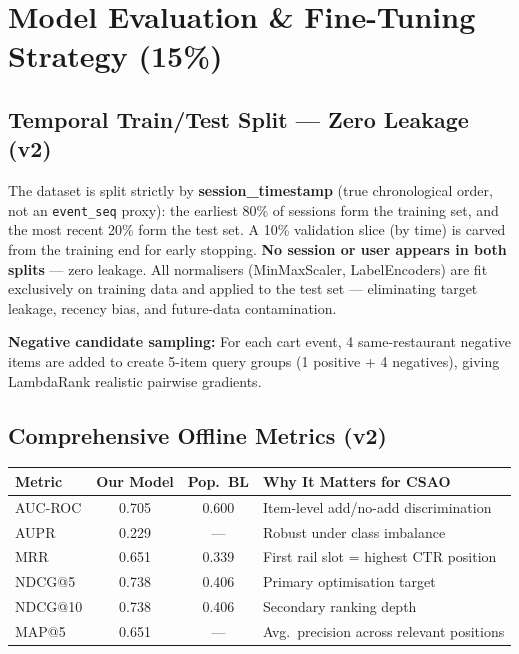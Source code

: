 \documentclass[11pt,a4paper]{article}
\begin{document}
\section{Model Evaluation \& Fine-Tuning Strategy (15\%)}

\subsection{Temporal Train/Test Split --- Zero Leakage (v2)}

The dataset is split strictly by \textbf{session\_timestamp}
(true chronological order, not an \texttt{event\_seq} proxy):
the earliest 80\% of sessions form the training set,
and the most recent 20\% form the test set.
A 10\% validation slice (by time) is carved from the training end
for early stopping.
\textbf{No session or user appears in both splits} --- zero leakage.
All normalisers (MinMaxScaler, LabelEncoders) are fit exclusively on
training data and applied to the test set --- eliminating target leakage,
recency bias, and future-data contamination.

\textbf{Negative candidate sampling:} For each cart event, 4 same-restaurant
negative items are added to create 5-item query groups
(1 positive + 4 negatives), giving LambdaRank realistic pairwise gradients.

\subsection{Comprehensive Offline Metrics (v2)}

{\small
\begin{center}
\begin{tabularx}{\linewidth}{l c c >{\RaggedRight\arraybackslash}X}
  \toprule
  \textbf{Metric} & \textbf{Our Model} & \textbf{Pop.\ BL} &
    \textbf{Why It Matters for CSAO} \\
  \midrule
  AUC-ROC      & 0.705 & 0.600 & Item-level add/no-add discrimination \\
  AUPR         & 0.229 & ---   & Robust under class imbalance \\
  MRR          & 0.651 & 0.339 & First rail slot = highest CTR position \\
  NDCG@5       & 0.738 & 0.406 & Primary optimisation target \\
  NDCG@10      & 0.738 & 0.406 & Secondary ranking depth \\
  MAP@5        & 0.651 & ---   & Avg.\ precision across relevant positions \\
  \bottomrule
\end{tabularx}
\end{center}
}
\end{document}
